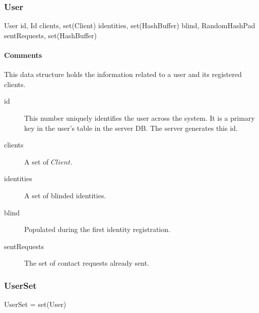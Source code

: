 \documentclass[a4paper,10pt]{article}
\begin{document}
\subsubsection{User}
\label{sec:structure:server:user}

\begin{verbbox}
User
{
  id, Id
  clients, set(Client)
  identities, set(HashBuffer)
  blind, RandomHashPad
  sentRequests, set(HashBuffer)
}
\end{verbbox}
\begin{center}
\theverbbox
\end{center}

\begin{inparaitem}[ ]
 \item \infrastructure
\end{inparaitem}

\paragraph*{Comments}
This data structure holds the information related to a user and its registered clients.

\SpecialItem
\begin{description}
 \item[id] This number uniquely identifies the user across the system. It is a primary key in the user's table in the server DB. The server generates this id.
 \item[clients] A set of $Client$.
 \item[identities] A set of blinded identities.
 \item[blind] Populated during the first identity registration.
 \item[sentRequests] The set of contact requests already sent.
\end{description}

\subsubsection{UserSet}

\begin{verbbox}
UserSet = set(User)
\end{verbbox}
\begin{center}
\theverbbox
\end{center}

\begin{inparaitem}[ ]
 \item \secure
 \item \persistent
 \item \unique
\end{inparaitem}
\end{document}
